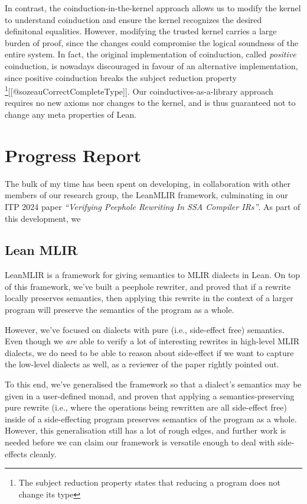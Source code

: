 In contrast, the coinduction-in-the-kernel approach allows us to modify
the kernel to understand coinduction and ensure the kernel recognizes
the desired definitonal equalities. However, modifying the trusted
kernel carries a large burden of proof, since the changes could
compromise the logical soundness of the entire system. In fact, the
original implementation of coinduction, called \emph{positive}
coinduction, is nowadays discouraged in favour of an alternative
implementation, since positive coinduction breaks the subject reduction
property \footnote{ The subject reduction property states that reducing
  a program does not change its type}{[}{[}@sozeauCorrectCompleteType{]}{]}.
Our coinductives-as-a-library approach requires no new axioms nor
changes to the kernel, and is thus guaranteed not to change any meta
properties of Lean.

\hypertarget{progress-report}{%
\section{Progress Report}\label{progress-report}}

The bulk of my time has been spent on developing, in collaboration with
other members of our research group, the LeanMLIR framework, culminating
in our ITP 2024 paper \emph{``Verifying Peephole Rewriting In SSA
Compiler IRs''}. As part of this development, we

\hypertarget{lean-mlir}{%
\subsection{Lean MLIR}\label{lean-mlir}}

LeanMLIR is a framework for giving semantics to MLIR dialects in Lean.
On top of this framework, we've built a peephole rewriter, and proved
that if a rewrite locally preserves semantics, then applying this
rewrite in the context of a larger program will preserve the semantics
of the program as a whole.

However, we've focused on dialects with pure (i.e., side-effect free)
semantics. Even though we \emph{are} able to verify a lot of interesting
rewrites in high-level MLIR dialects, we do need to be able to reason
about side-effect if we want to capture the low-level dialects as well,
as a reviewer of the paper rightly pointed out.

To this end, we've generalised the framework so that a dialect's
semantics may be given in a user-defined monad, and proven that applying
a semantics-preserving pure rewrite (i.e., where the operations being
rewritten are all side-effect free) inside of a side-effecting program
preserves semantics of the program as a whole. However, this
generalisation still has a lot of rough edges, and further work is
needed before we can claim our framework is versatile enough to deal
with side-effects cleanly.


